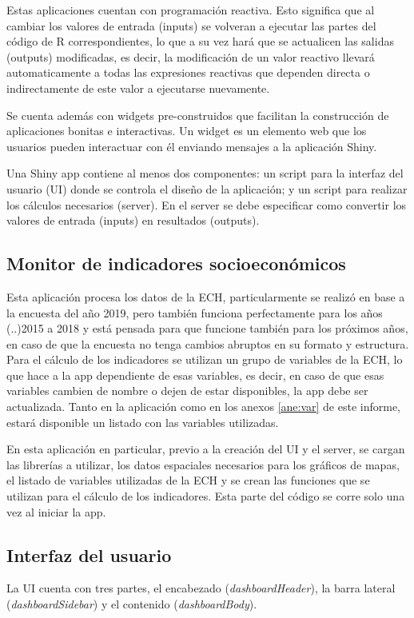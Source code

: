 \documentclass[12pt,twoside,spanish,a4paper]{book}\usepackage[]{graphicx}\usepackage[]{color}
\begin{document}
Estas aplicaciones cuentan con programación reactiva. Esto significa que al cambiar los valores de entrada (inputs) se volveran a ejecutar las partes del código de R correspondientes, lo que a su vez hará que se actualicen las salidas (outputs) modificadas, es decir, la modificación de un valor reactivo llevará automaticamente a todas las expresiones reactivas que dependen directa o indirectamente de este valor a ejecutarse nuevamente. 

Se cuenta además con widgets pre-construidos que facilitan la construcción de aplicaciones bonitas e interactivas. Un widget es un elemento web que los usuarios pueden interactuar con él enviando mensajes a la aplicación Shiny.

Una Shiny app contiene al menos dos componentes: un script para la interfaz del usuario (UI) donde se controla el diseño de la aplicación; y un script para realizar los cálculos necesarios (server). En el server se debe especificar como convertir los valores de entrada (inputs) en resultados (outputs).

\subsection{Monitor de indicadores socioeconómicos \label{subsec:app}}

Esta aplicación procesa los datos de la ECH, particularmente se realizó en base a la encuesta del año 2019, pero también funciona perfectamente para los años (..)2015 a 2018 y está pensada para que funcione también para los próximos años, en caso de que la encuesta no tenga cambios abruptos en su formato y estructura. Para el cálculo de los indicadores se utilizan un grupo de variables de la ECH, lo que hace a la app dependiente de esas variables, es decir, en caso de que esas variables cambien de nombre o dejen de estar disponibles, la app debe ser actualizada. Tanto en la aplicación como en los anexos \ref{ane:var} de este informe, estará disponible un listado con las variables utilizadas.

En esta aplicación en particular, previo a la creación del UI y el server, se cargan las librerías a utilizar, los datos espaciales necesarios para los gráficos de mapas, el listado de variables utilizadas de la ECH y se crean las funciones que se utilizan para el cálculo de los indicadores. Esta parte del código se corre solo una vez al iniciar la app.

\subsection{Interfaz del usuario \label{subsec:ui}}
La UI cuenta con tres partes, el encabezado (\textit{dashboardHeader}), la barra lateral (\textit{dashboardSidebar}) y el contenido (\textit{dashboardBody}).
\end{document}
